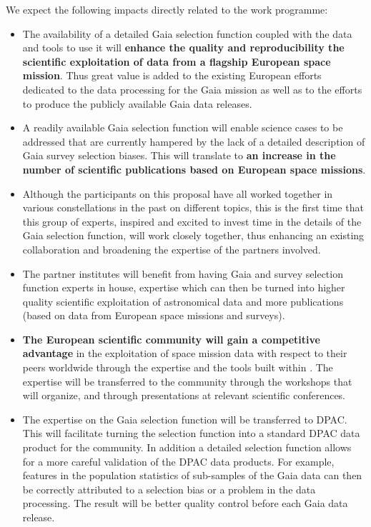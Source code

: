 We expect the following impacts directly related to the work programme:
\begin{itemize}
    \item The availability of a detailed Gaia selection function coupled with the data and tools to use it will \textbf{enhance the quality and reproducibility the scientific exploitation of data from a flagship European space mission}. Thus great value is added to the existing European efforts dedicated to the data processing for the Gaia mission as well as to the efforts to produce the publicly available Gaia data releases.
    \item A readily available Gaia selection function will enable science cases to be addressed that are currently hampered by the lack of a detailed description of Gaia survey selection biases. This will translate to \textbf{an increase in the number of scientific publications based on European space missions}.
    \item Although the participants on this proposal have all worked together in various constellations in the past on different topics, this is the first time that this group of experts, inspired and excited to invest time in the details of the Gaia selection function, will work closely together, thus enhancing an existing collaboration and broadening the expertise of the partners involved.
    \item The partner institutes will benefit from having Gaia and survey selection function experts in house, expertise which can then be turned into higher quality scientific exploitation of astronomical data and more publications (based on data from European space missions and surveys).
    \item \textbf{The European scientific community will gain a competitive advantage} in the exploitation of space mission data with respect to their peers worldwide through the expertise and the tools built within {\acro}. The expertise will be transferred to the community through the workshops that {\acro} will organize, and through presentations at relevant scientific conferences.
    \item The expertise on the Gaia selection function will be transferred to DPAC. This will facilitate turning the selection function into a standard DPAC data product for the community. In addition a detailed selection function allows for a more careful validation of the DPAC data products. For example, features in the population statistics of sub-samples of the Gaia data can then be correctly attributed to a selection bias or a problem in the data processing. The result will be better quality control before each Gaia data release.

\end{itemize}
